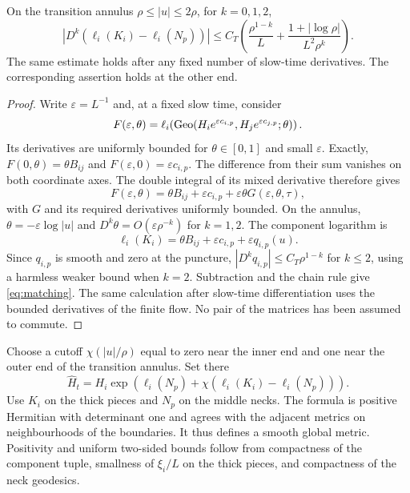 \begin{lemma}\label{lem:matching}
On the transition annulus $\rho\le|u|\le2\rho$, for $k=0,1,2$,
\begin{equation}\label{eq:matching}
 |D^k(\ell_i(K_i)-\ell_i(N_p))|
 \le C_T\left(\frac{\rho^{1-k}}{L}
       +\frac{1+|\log\rho|}{L^2\rho^k}\right).
\end{equation}
The same estimate holds after any fixed number of slow-time
derivatives. The corresponding assertion holds at the other end.
\end{lemma}
\begin{proof}
Write $\varepsilon=L^{-1}$ and, at a fixed slow time, consider
\[
 F(\varepsilon,\theta)=\ell_i\!\left(
 \operatorname{Geo}(H_i e^{\varepsilon c_{i,p}},
       H_j e^{\varepsilon c_{j,p}};\theta)\right).
\]
Its derivatives are uniformly bounded for $\theta\in[0,1]$ and
small $\varepsilon$. Exactly,
$F(0,\theta)=\theta B_{ij}$ and $F(\varepsilon,0)=\varepsilon c_{i,p}$.
The difference from their sum vanishes on both coordinate axes.
The double integral of its mixed derivative therefore gives
\[
 F(\varepsilon,\theta)
 =\theta B_{ij}+\varepsilon c_{i,p}
     +\varepsilon\theta G(\varepsilon,\theta,\tau),
\]
with $G$ and its required derivatives uniformly bounded. On the
annulus, $\theta=-\varepsilon\log|u|$ and
$D^k\theta=O(\varepsilon\rho^{-k})$ for $k=1,2$. The component
logarithm is
\[
 \ell_i(K_i)=\theta B_{ij}+\varepsilon c_{i,p}
                         +\varepsilon q_{i,p}(u).
\]
Since $q_{i,p}$ is smooth and zero at the puncture,
$|D^kq_{i,p}|\le C_T\rho^{1-k}$ for $k\le2$, using a harmless
weaker bound when $k=2$. Subtraction and the chain rule give
\eqref{eq:matching}. The same calculation after slow-time
differentiation uses the bounded derivatives of the finite flow.
No pair of the matrices has been assumed to commute.
\end{proof}

Choose a cutoff $\chi(|u|/\rho)$ equal to zero near the inner end
and one near the outer end of the transition annulus. Set there
\begin{equation}\label{eq:interpolation}
 \widehat H_t=H_i\exp\!\left(
       \ell_i(N_p)+\chi(\ell_i(K_i)-\ell_i(N_p))\right).
\end{equation}
Use $K_i$ on the thick pieces and $N_p$ on the middle necks.
The formula is positive Hermitian with determinant one and agrees
with the adjacent metrics on neighbourhoods of the boundaries.
It thus defines a smooth global metric. Positivity and uniform
two-sided bounds follow from compactness of the component tuple,
smallness of $\xi_i/L$ on the thick pieces, and compactness of the
neck geodesics.

